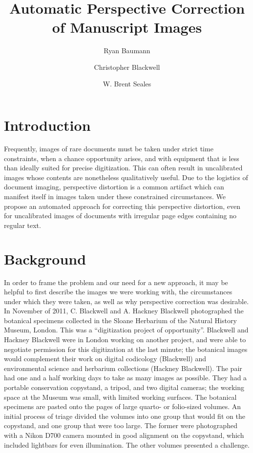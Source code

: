\documentclass[runningheads,a4paper]{llncs}
\begin{document}
\mainmatter

\title{Automatic Perspective Correction of Manuscript Images}

\author{Ryan Baumann \and Christopher Blackwell \and W. Brent Seales}


\maketitle

\section{Introduction}

Frequently, images of rare documents must be taken under strict time constraints, 
when a chance opportunity arises, and with equipment that is less than ideally suited 
for precise digitization. This can often result in uncalibrated images
whose contents are nonetheless qualitatively useful. Due to the logistics of document
imaging, perspective distortion is a common artifact which can manifest itself in
images taken under these constrained circumstances. We propose an automated approach for
correcting this perspective distortion, even for uncalibrated images of documents
with irregular page edges containing no regular text.

\section{Background}

In order to frame the problem and our need for a new approach, it may be helpful to first describe the images
we were working with, the circumstances under which they were taken, as well as why perspective correction was desirable.
In November of 2011, C. Blackwell and A. Hackney Blackwell photographed the botanical specimens collected in the Sloane Herbarium of the Natural History Museum, London. This was a “digitization project of opportunity”. Blackwell and Hackney Blackwell were in London working on another project, and were able to negotiate permission for this digitization at the last minute; the botanical images would complement their work on digital codicology (Blackwell) and environmental science and herbarium collections (Hackney Blackwell). The pair had one and a half working days to take as many images as possible. They had a portable conservation copystand, a tripod, and two digital cameras; the working space at the Museum was small, with limited working surfaces. The botanical specimens are pasted onto the pages of large quarto- or folio-sized volumes. An initial process of triage divided the volumes into one group that would fit on the copystand, and one group that were too large. The former were photographed with a Nikon D700 camera mounted in good alignment on the copystand, which included lightbars for even illumination. The other volumes presented a challenge.
\end{document}
